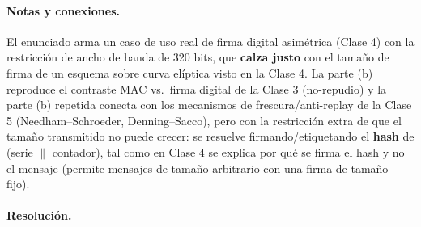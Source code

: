 \paragraph{Notas y conexiones.}
El enunciado arma un caso de uso real de firma digital asimétrica (Clase 4) con la
restricción de ancho de banda de 320 bits, que \textbf{calza justo} con el tamaño de firma
de un esquema sobre curva elíptica visto en la Clase 4. La parte (b) reproduce el
contraste MAC vs.\ firma digital de la Clase 3 (no-repudio) y la parte (b) repetida conecta
con los mecanismos de frescura/anti-replay de la Clase 5 (Needham--Schroeder,
Denning--Sacco), pero con la restricción extra de que el tamaño transmitido no puede
crecer: se resuelve firmando/etiquetando el \textbf{hash} de (serie $\|$ contador), tal
como en Clase 4 se explica por qué se firma el hash y no el mensaje (permite mensajes de
tamaño arbitrario con una firma de tamaño fijo).

\paragraph{Resolución.}

